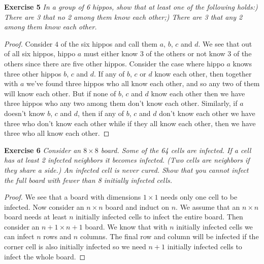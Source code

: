 \documentclass{article}
\begin{document}
\begin{flushleft}
\textbf{Exercise 5}
\textsl{In a group of 6 hippos, show that at least one of the following holds:) There are 3 that no 2 among them know each other;) There are 3 that any 2 among them know each other.}
\begin{proof}
Consider $4$ of the six hippos and call them $a$, $b$, $c$ and $d$. We see that out of all six hippos, hippo $a$ must either know $3$ of the others or not know $3$ of the others since there are five other hippos. Consider the case where hippo $a$ knows three other hippos $b$, $c$ and $d$. If any of $b$, $c$ or $d$ know each other, then together with $a$ we've found three hippos who all know each other, and so any two of them will know each other. But if none of $b$, $c$ and $d$ know each other then we have three hippos who any two among them don't know each other. Similarly, if $a$ doesn't know $b$, $c$ and $d$, then if any of $b$, $c$ and $d$ don't know each other we have three who don't know each other while if they all know each other, then we have three who all know each other.
\end{proof}

\textbf{Exercise 6}
\textsl{Consider an $8 \times 8$ board. Some of the 64 cells are infected. If a cell has at least 2 infected neighbors it becomes infected. (Two cells are neighbors if they share a side.) An infected cell is never cured. Show that you cannot infect the full board with fewer than 8 initially infected cells.}
\begin{proof}
We see that a board with dimensions $1 \times 1$ needs only one cell to be infected. Now consider an $n \times n$ board and induct on $n$. We assume that an $n \times n$ board needs at least $n$ initially infected cells to infect the entire board. Then consider an $n+1 \times n+1$ board. We know that with $n$ initially infected cells we can infect $n$ rows and $n$ columns. The final row and column will be infected if the corner cell is also initially infected so we need $n+1$ initially infected cells to infect the whole board.
\end{proof}




\end{flushleft}
\end{document}
